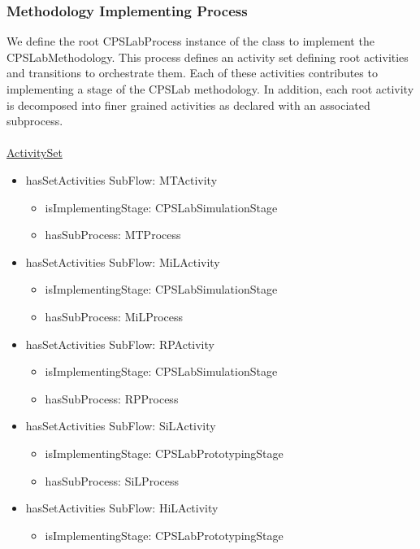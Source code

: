 \subsubsection{Methodology Implementing Process}

We define the root CPSLabProcess instance of the  class to implement the CPSLabMethodology. This process defines an activity set defining root activities and transitions to orchestrate them. Each of these activities contributes to implementing a stage of the CPSLab methodology. In addition, each root activity is decomposed into finer grained activities as declared with an associated subprocess.
\\
\\
\noindent\uline{ActivitySet}
     \begin{itemize}
    \item hasSetActivities SubFlow: MTActivity
        \begin{itemize}
            \item isImplementingStage: CPSLabSimulationStage
            \item hasSubProcess: MTProcess
        \end{itemize}
    \item hasSetActivities SubFlow: MiLActivity
        \begin{itemize}
            \item isImplementingStage: CPSLabSimulationStage
            \item hasSubProcess: MiLProcess
        \end{itemize}
    \item hasSetActivities SubFlow: RPActivity
        \begin{itemize}
            \item isImplementingStage: CPSLabSimulationStage
            \item hasSubProcess: RPProcess
        \end{itemize}
    \item hasSetActivities SubFlow: SiLActivity
        \begin{itemize}
            \item isImplementingStage: CPSLabPrototypingStage
            \item hasSubProcess: SiLProcess
        \end{itemize}
    \item hasSetActivities SubFlow: HiLActivity
        \begin{itemize}
            \item isImplementingStage: CPSLabPrototypingStage

\end{itemize}
\end{itemize}
